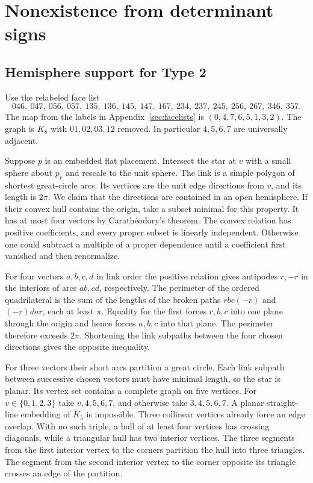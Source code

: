 \documentclass[11pt,letterpaper]{amsart}
\begin{document}
\section{Nonexistence from determinant signs}\label{sec:obstruction}

\subsection*{Hemisphere support for Type 2}

Use the relabeled face list
\[
 046,\ 047,\ 056,\ 057,\ 135,\ 136,\ 145,\ 147,
 \ 167,\ 234,\ 237,\ 245,\ 256,\ 267,\ 346,\ 357.
\]
The map from the labels in Appendix~\ref{sec:facelists} is
\((0,4,7,6,5,1,3,2)\). The graph is \(K_8\) with \(01,02,03,12\)
removed. In particular \(4,5,6,7\) are universally adjacent.

Suppose \(p\) is an embedded flat placement. Intersect the star at
\(v\) with a small sphere about \(p_v\) and rescale to the unit sphere.
The link is a simple polygon of shortest great-circle arcs. Its
vertices are the unit edge directions from \(v\), and its length is
\(2\pi\). We claim that the directions are contained in an open
hemisphere. If their convex hull contains the origin, take a subset
minimal for this property. It has at most four vectors by
Carath\'eodory's theorem. The convex relation has positive coefficients,
and every proper subset is linearly independent. Otherwise one could
subtract a multiple of a proper dependence until a coefficient first
vanished and then renormalize.

For four vectors \(a,b,c,d\) in link order the positive relation gives
antipodes \(r,-r\) in the interiors of arcs \(ab,cd\), respectively.
The perimeter of the ordered quadrilateral is the sum of the lengths
of the broken paths \(rbc(-r)\) and \((-r)dar\), each at least \(\pi\).
Equality for the first forces \(r,b,c\) into one plane through the
origin and hence forces \(a,b,c\) into that plane. The perimeter
therefore exceeds \(2\pi\). Shortening the link subpaths between the
four chosen directions gives the opposite inequality.

For three vectors their short arcs partition a great circle. Each
link subpath between successive chosen vectors must have minimal
length, so the star is planar. Its vertex set contains a complete graph
on five vertices. For \(v\in\{0,1,2,3\}\) take \(v,4,5,6,7\), and
otherwise take \(3,4,5,6,7\). A planar straight-line embedding of
\(K_5\) is impossible. Three collinear vertices already force an
edge overlap. With no such triple, a hull of at least four vertices
has crossing diagonals, while a triangular hull has two interior
vertices. The three segments from the first interior vertex to the
corners partition the hull into three triangles. The segment from
the second interior vertex to the corner opposite its triangle
crosses an edge of the partition.
\end{document}
